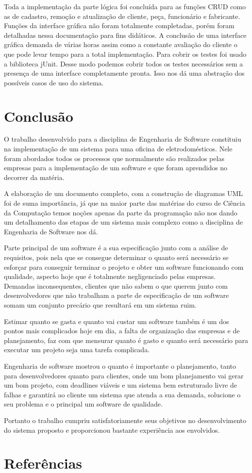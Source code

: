 \documentclass[a4paper,10pt]{article}
\begin{document}
Toda a implementação da parte lógica foi concluída para as funções CRUD como as de cadastro, remoção e atualização de cliente, peça, funcionário e fabricante. Funções da interface gráfica não foram totalmente completadas, porém foram detalhadas nessa documentação para fins didáticos. A conclusão de uma interface gráfica demanda de várias horas assim como a constante avaliação do cliente o que pode levar tempo para a total implementação. Para cobrir os testes foi usado a biblioteca jUnit. Desse modo podemos cobrir todos os testes necessários sem a presença de uma interface completamente pronta. Isso nos dá uma abstração dos possíveis casos de uso do sistema.

\section{Conclusão}

O trabalho desenvolvido para a disciplina de Engenharia de Software constituiu na implementação de um sistema para uma oficina de eletrodomésticos. Nele foram abordados todos os processos que normalmente são realizados pelas empresas para a implementação de um software e que foram aprendidos no decorrer da matéria. 

A elaboração de um documento completo, com a construção de diagramas UML foi de suma importância, já que na maior parte das matérias do curso de Ciência da Computação temos noções apenas da parte da programação não nos dando um detalhamento das etapas de um sistema mais complexo como a disciplina de Engenharia de Software nos dá. 

Parte principal de um software é a sua especificação junto com a análise de requisitos, pois nela que se consegue determinar o quanto será necessário se esforçar para conseguir terminar o projeto e obter um software funcionando com qualidade, aspecto hoje que é totalmente negligenciado pelas empresas. Demandas inconsequentes, clientes que não sabem o que querem junto com desenvolvedores que não trabalham a parte de especificação de um software somam um conjunto precário que resultará em um sistema ruim. 

Estimar quanto se gasta e quanto vai custar um software também é um dos pontos mais complicados hoje em dia, a falta de organização das empresas e de planejamento, faz com que mensurar quanto é gasto e quanto será necessário para executar um projeto seja uma tarefa complicada. 

Engenharia de software mostrou o quanto é importante o planejamento, tanto para desenvolvedores quanto para clientes, onde um bom planejamento vai gerar um bom projeto, com deadlines viáveis e um sistema bem estruturado livre de falhas e garantirá ao cliente um sistema que atenda a sua demanda, solucione o seu problema e o principal um software de qualidade.

Portanto o trabalho cumpriu satisfatoriamente seus objetivos no desenvolvimento do sistema proposto e proporcionou bastante experiência aos envolvidos.

\section{Referências}
\end{document}

